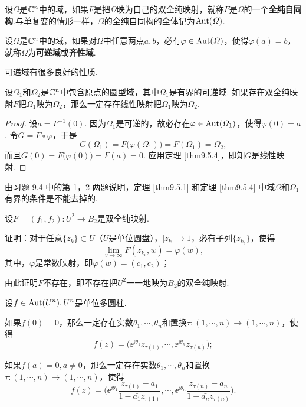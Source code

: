 设$\Omega$是$\mathbb C^n$中的域，如果$F$是把$\Omega$映为自己的双全纯映射，就称$F$是$\Omega$的一个\textbf{全纯自同构}.与单复变的情形一样，$\Omega$的全纯自同构的全体记为$\operatorname{Aut}(\varOmega)$.
\begin{definition}\label{def9.5.5}
  设$\Omega$是$\mathbb C^n$中的域，如果对$\Omega$中任意两点$a,b$，必有$\varphi\in\operatorname{Aut}(\varOmega)$，使得$\varphi(a)=b$，就称$\Omega$为\textbf{可递域}或\textbf{齐性域}.
\end{definition}

可递域有很多良好的性质.
\begin{theorem}\label{thm9.5.6}
  设$\Omega_1$和$\Omega_2$是$\mathbb C^n$中包含原点的圆型域，其中$\Omega_1$是有界的可递域. 如果存在双全纯映射$F$把$\Omega_1$映为$\Omega_2$，那么一定存在线性映射把$\Omega_1$映为$\Omega_2$.
\end{theorem}
\begin{proof}
  设$a=F^{-1}(0)$. 因为$\Omega_1$是可递的，故必存在$\varphi\in\operatorname{Aut}(\varOmega_1)$，使得$\varphi(0)=a$. 令$G=F\circ \varphi$，于是
  \[
    G(\Omega_1) = F\big(\varphi(\Omega_1)\big) = F(\Omega_1) = \Omega_2,
  \]
  而且$G(0)=F\big(\varphi(0)\big)=F(a)=0$. 应用定理 \ref{thm9.5.4}，即知$G$是线性映射.
\end{proof}

\begin{xiti}
  \item 由习题  \hyperlink{xiti9.4}{9.4} 中的第 \hyperlink{xiti9.4.1}{1}，\hyperlink{xiti9.4.2}{2} 两题说明，定理 \ref{thm9.5.1} 和定理 \ref{thm9.5.4} 中域$\Omega$和$\Omega_1$有界的条件是不能去掉的.
  \item 设$F=(f_1,f_2):U^2\to B_2$是双全纯映射.
    \begin{enuma}
      \item 证明：对于任意$\{z_k\}\subset U$（$U$是单位圆盘），$|z_k|\to1$，必有子列$\{z_{k_v}\}$，使得
        \[
          \lim_{v\to\infty}F(z_{k_v},w) = \varphi(w),
        \]
        其中，$\varphi$是常数映射，即$\varphi(w)=(c_1,c_2)$；
      \item 由此证明$F$不存在，即不存在把$U^2$一一地映为$B_2$的双全纯映射.
    \end{enuma}
  \item 设$f\in\operatorname{Aut}(U^n),U^n$是单位多圆柱.
    \begin{enuma}
      \item 如果$f(0)=0$，那么一定存在实数$\theta_1,\cdots,\theta_n$和置换$\tau:(1,\cdots,n)\to(1,\cdots,n)$，使得
         \[
           f(z) = \big(\ee^{\ii\theta_1}z_{\tau(1)},\cdots,\ee^{\ii\theta_n}z_{\tau(n)}\big);
         \]
      \item 如果$f(a)=0,a\ne0$，那么一定存在实数$\theta_1,\cdots,\theta_n$和置换$\tau:(1,\cdots,n)\to(1,\cdots,n)$，使得
         \[
           f(z) = \bigg(\ee^{\ii\theta_1}\frac{z_{\tau(1)}-a_1}{1-\bar{a_1}z_{\tau(1)}},
          \cdots,\ee^{\ii\theta_n}\frac{z_{\tau(n)}-a_n}{1-\bar{a_n}z_{\tau(n)}}\bigg).
         \]
    \end{enuma}
\end{xiti}

